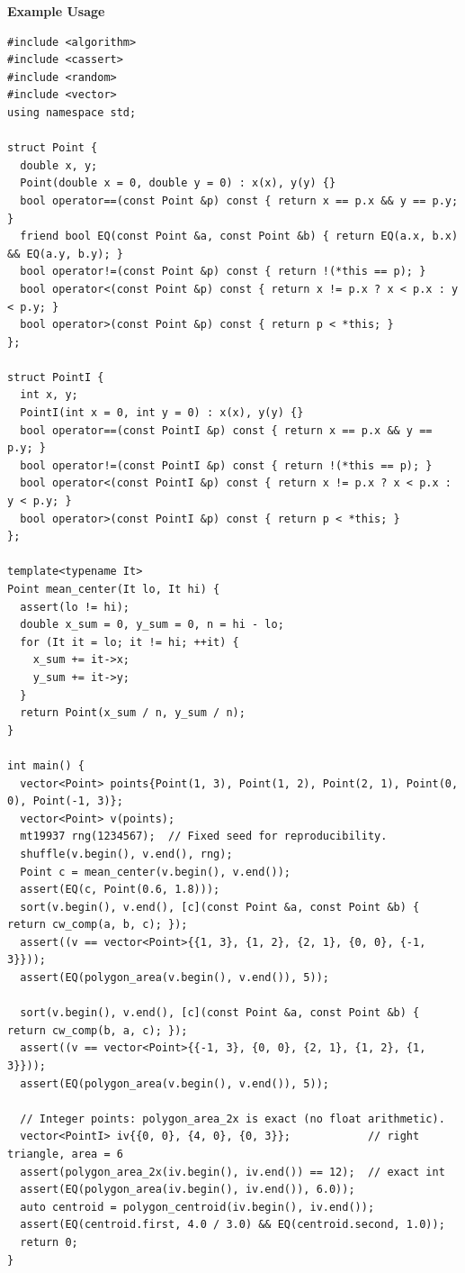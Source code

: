 \textbf{Example Usage}\par
\begin{lstlisting}[style=cpp]
#include <algorithm>
#include <cassert>
#include <random>
#include <vector>
using namespace std;

struct Point {
  double x, y;
  Point(double x = 0, double y = 0) : x(x), y(y) {}
  bool operator==(const Point &p) const { return x == p.x && y == p.y; }
  friend bool EQ(const Point &a, const Point &b) { return EQ(a.x, b.x) && EQ(a.y, b.y); }
  bool operator!=(const Point &p) const { return !(*this == p); }
  bool operator<(const Point &p) const { return x != p.x ? x < p.x : y < p.y; }
  bool operator>(const Point &p) const { return p < *this; }
};

struct PointI {
  int x, y;
  PointI(int x = 0, int y = 0) : x(x), y(y) {}
  bool operator==(const PointI &p) const { return x == p.x && y == p.y; }
  bool operator!=(const PointI &p) const { return !(*this == p); }
  bool operator<(const PointI &p) const { return x != p.x ? x < p.x : y < p.y; }
  bool operator>(const PointI &p) const { return p < *this; }
};

template<typename It>
Point mean_center(It lo, It hi) {
  assert(lo != hi);
  double x_sum = 0, y_sum = 0, n = hi - lo;
  for (It it = lo; it != hi; ++it) {
    x_sum += it->x;
    y_sum += it->y;
  }
  return Point(x_sum / n, y_sum / n);
}

int main() {
  vector<Point> points{Point(1, 3), Point(1, 2), Point(2, 1), Point(0, 0), Point(-1, 3)};
  vector<Point> v(points);
  mt19937 rng(1234567);  // Fixed seed for reproducibility.
  shuffle(v.begin(), v.end(), rng);
  Point c = mean_center(v.begin(), v.end());
  assert(EQ(c, Point(0.6, 1.8)));
  sort(v.begin(), v.end(), [c](const Point &a, const Point &b) { return cw_comp(a, b, c); });
  assert((v == vector<Point>{{1, 3}, {1, 2}, {2, 1}, {0, 0}, {-1, 3}}));
  assert(EQ(polygon_area(v.begin(), v.end()), 5));

  sort(v.begin(), v.end(), [c](const Point &a, const Point &b) { return cw_comp(b, a, c); });
  assert((v == vector<Point>{{-1, 3}, {0, 0}, {2, 1}, {1, 2}, {1, 3}}));
  assert(EQ(polygon_area(v.begin(), v.end()), 5));

  // Integer points: polygon_area_2x is exact (no float arithmetic).
  vector<PointI> iv{{0, 0}, {4, 0}, {0, 3}};            // right triangle, area = 6
  assert(polygon_area_2x(iv.begin(), iv.end()) == 12);  // exact int
  assert(EQ(polygon_area(iv.begin(), iv.end()), 6.0));
  auto centroid = polygon_centroid(iv.begin(), iv.end());
  assert(EQ(centroid.first, 4.0 / 3.0) && EQ(centroid.second, 1.0));
  return 0;
}
\end{lstlisting}
